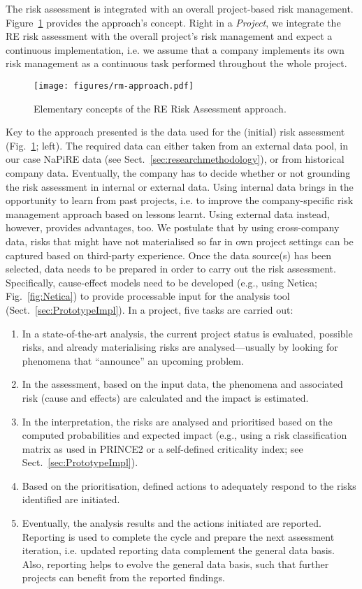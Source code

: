 \documentclass[lnbip]{svmultln}
\begin{document}
The risk assessment is integrated with an overall project-based risk management. Figure~\ref{fig:RMApproach} provides the approach's concept. Right in a \emph{Project}, we integrate the RE risk assessment with the overall project's risk management and expect a continuous implementation, i.e. we assume that a company implements its own risk management as a continuous task performed throughout the whole project.
\begin{figure}[!hbtp]
\centering
  \texttt{[image: figures/rm-approach.pdf]}\\
  \caption{Elementary concepts of the RE Risk Assessment approach.}
  \label{fig:RMApproach}
\end{figure} 

Key to the approach presented is the data used for the (initial) risk assessment (Fig.~\ref{fig:RMApproach}; left). The required data can either taken from an external data pool, in our case NaPiRE data (see Sect.~\ref{sec:researchmethodology}), or from historical company data. Eventually, the company has to decide whether or not grounding the risk assessment in internal or external data. Using internal data brings in the opportunity to learn from past projects, i.e. to improve the company-specific risk management approach based on lessons learnt. Using external data instead, however, provides advantages, too. We postulate that by using cross-company data, risks that might have not materialised so far in own project settings can be captured based on third-party experience. Once the data source(s) has been selected, data needs to be prepared in order to carry out the risk assessment. Specifically, cause-effect models need to be developed (e.g., using Netica; Fig.~\ref{fig:Netica}) to provide processable input for the analysis tool (Sect.~\ref{sec:PrototypeImpl}). In a project, five tasks are carried out: 
\begin{enumerate}
	\item In a state-of-the-art analysis, the current project status is evaluated, possible risks, and already materialising risks are analysed---usually by looking for phenomena that ``announce'' an upcoming problem.
	\item In the assessment, based on the input data, the phenomena and associated risk (cause and effects) are calculated and the impact is estimated.
	\item In the interpretation, the risks are analysed and prioritised based on the computed probabilities and expected impact (e.g., using a risk classification matrix as used in PRINCE2 or a self-defined criticality index; see Sect.~\ref{sec:PrototypeImpl}).
	\item Based on the prioritisation, defined actions to adequately respond to the risks identified are initiated.
	\item Eventually, the analysis results and the actions initiated are reported. Reporting is used to complete the cycle and prepare the next assessment iteration, i.e. updated reporting data complement the general data basis. Also, reporting helps to evolve the general data basis, such that further projects can benefit from the reported findings.
\end{enumerate}
\end{document}
